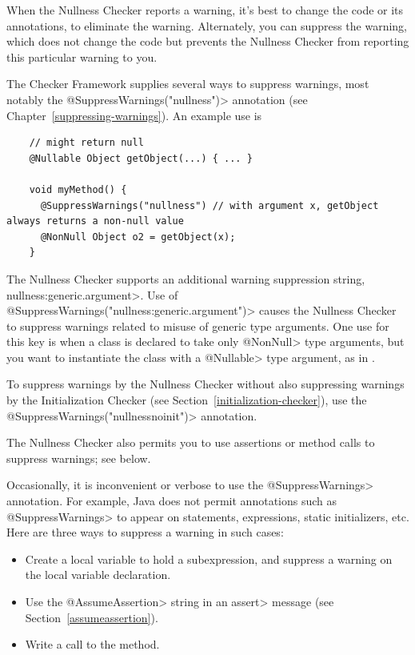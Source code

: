 When the Nullness Checker reports a warning, it's best to change the code
or its annotations, to eliminate the warning.  Alternately, you can
suppress the warning, which does not change the code but prevents the
Nullness Checker from reporting this particular warning to you.

\begin{sloppypar}
The Checker Framework supplies several ways to suppress warnings, most
notably the \<@SuppressWarnings("nullness")> annotation (see
Chapter~\ref{suppressing-warnings}).  An example use is
\end{sloppypar}

\begin{smaller}
\begin{Verbatim}
    // might return null
    @Nullable Object getObject(...) { ... }

    void myMethod() {
      @SuppressWarnings("nullness") // with argument x, getObject always returns a non-null value
      @NonNull Object o2 = getObject(x);
    }
\end{Verbatim}
\end{smaller}


The Nullness Checker supports an additional warning suppression string,
\<nullness:generic.argument>.
Use of \<@SuppressWarnings("nullness:generic.argument")> causes the Nullness
Checker to suppress warnings related to misuse of generic type
arguments.  One use for this key is when a class is declared to take only
\<@NonNull> type arguments, but you want to instantiate the class with a
\<@Nullable> type argument, as in .

To suppress warnings by the Nullness Checker without also suppressing warnings
by the Initialization Checker (see Section~\ref{initialization-checker}),
use the \<@SuppressWarnings("nullnessnoinit")> annotation.

The Nullness Checker also permits you to use assertions or method calls to
suppress warnings; see below.




Occasionally, it is inconvenient or
verbose to use the \<@SuppressWarnings> annotation.  For example, Java does
not permit annotations such as \<@SuppressWarnings> to appear on
statements, expressions, static initializers, etc.
Here are three ways to suppress a warning in such cases:
\begin{itemize}
\item
  Create a local variable to hold a subexpression, and
  suppress a warning on the local variable declaration.
\item
  Use the \<@AssumeAssertion> string in
  an \<assert> message (see Section~\ref{assumeassertion}).
\item
  Write a call to the
   method.
\end{itemize}


